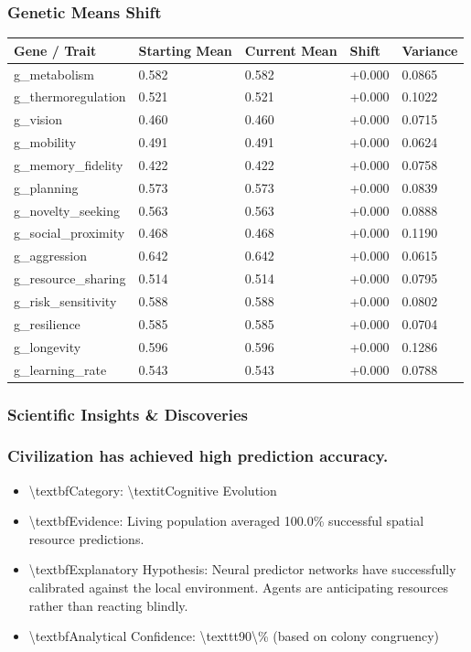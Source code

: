 \documentclass[11pt,a4paper]{article}
\begin{document}
\subsubsection*{ Genetic Means Shift}
\begin{longtable}{lllll}
\toprule
Gene / Trait & Starting Mean & Current Mean & Shift & Variance \\
\midrule
\endhead
g\_metabolism & 0.582 & 0.582 & +0.000 & 0.0865 \\
g\_thermoregulation & 0.521 & 0.521 & +0.000 & 0.1022 \\
g\_vision & 0.460 & 0.460 & +0.000 & 0.0715 \\
g\_mobility & 0.491 & 0.491 & +0.000 & 0.0624 \\
g\_memory\_fidelity & 0.422 & 0.422 & +0.000 & 0.0758 \\
g\_planning & 0.573 & 0.573 & +0.000 & 0.0839 \\
g\_novelty\_seeking & 0.563 & 0.563 & +0.000 & 0.0888 \\
g\_social\_proximity & 0.468 & 0.468 & +0.000 & 0.1190 \\
g\_aggression & 0.642 & 0.642 & +0.000 & 0.0615 \\
g\_resource\_sharing & 0.514 & 0.514 & +0.000 & 0.0795 \\
g\_risk\_sensitivity & 0.588 & 0.588 & +0.000 & 0.0802 \\
g\_resilience & 0.585 & 0.585 & +0.000 & 0.0704 \\
g\_longevity & 0.596 & 0.596 & +0.000 & 0.1286 \\
g\_learning\_rate & 0.543 & 0.543 & +0.000 & 0.0788 \\
\bottomrule
\end{longtable}

\subsubsection*{ Scientific Insights \& Discoveries}
\subsubsection*{ Civilization has achieved high prediction accuracy.}
\begin{itemize}
  \item \textbackslash{}textbf{Category:} \textbackslash{}textit{Cognitive Evolution}
  \item \textbackslash{}textbf{Evidence:} Living population averaged 100.0\% successful spatial resource predictions.
  \item \textbackslash{}textbf{Explanatory Hypothesis:} Neural predictor networks have successfully calibrated against the local environment. Agents are anticipating resources rather than reacting blindly.
  \item \textbackslash{}textbf{Analytical Confidence:} \textbackslash{}texttt{90\textbackslash{}\%} (based on colony congruency)
\end{itemize}
\end{document}
